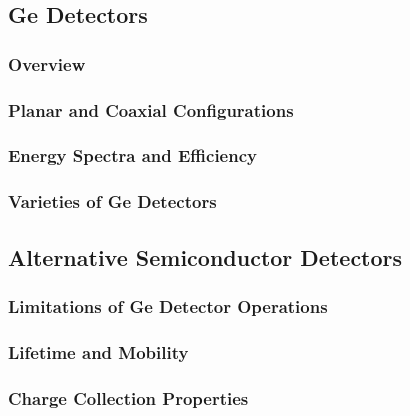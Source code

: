 \subsection{Ge Detectors}
\subsubsection{Overview}
\subsubsection{Planar and Coaxial Configurations}
\subsubsection{Energy Spectra and Efficiency}
\subsubsection{Varieties of Ge Detectors}
\subsection{Alternative Semiconductor Detectors}
\subsubsection{Limitations of Ge Detector Operations}
\subsubsection{Lifetime and Mobility}
\subsubsection{Charge Collection Properties}